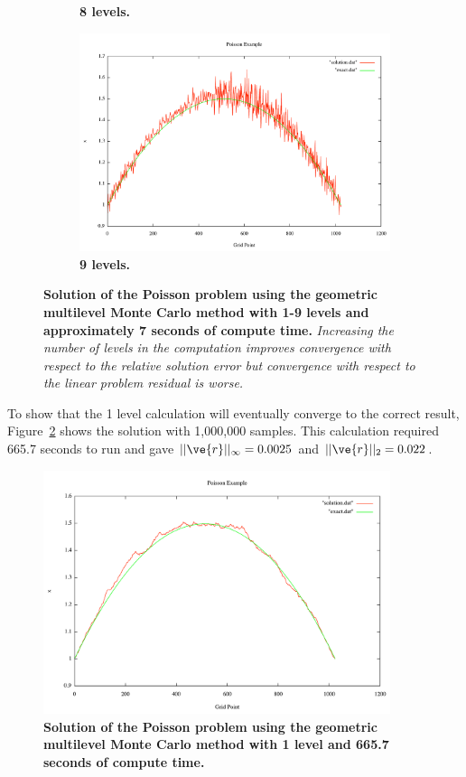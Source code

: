 \documentclass[note]{TechNote}
\begin{document}
\begin{figure}[h!]
\begin{subfigure}[b]{0.32\textwidth}
    \caption{\textbf{8 levels.}}
  \end{subfigure}
  \begin{subfigure}[b]{0.32\textwidth}
    \includegraphics[width=\textwidth]{7_sec_9_level.pdf}
    \caption{\textbf{9 levels.}}
  \end{subfigure}
  \caption{\textbf{Solution of the Poisson problem using the geometric
      multilevel Monte Carlo method with 1-9 levels and approximately
      7 seconds of compute time.} \textit{Increasing the number of
      levels in the computation improves convergence with respect to
      the relative solution error but convergence with respect to the
      linear problem residual is worse.}}
  \label{fig:heterogenous_fixed_t}
\end{figure}

To show that the 1 level calculation will eventually converge to the
correct result, Figure~\ref{fig:converged_1_level} shows the solution
with 1,000,000 samples. This calculation required 665.7 seconds to run
and gave $||\ve{r}||_\infty = 0.0025$ and $||\ve{r}||_2 = 0.022$.
\begin{figure}[h!]
  \begin{center}
    \includegraphics[width=4in]{converged_1_level.pdf}
  \end{center}
  \caption{\textbf{Solution of the Poisson problem using the geometric
      multilevel Monte Carlo method with 1 level and 665.7 seconds of
      compute time.}}
  \label{fig:converged_1_level}
\end{figure}
\end{document}
